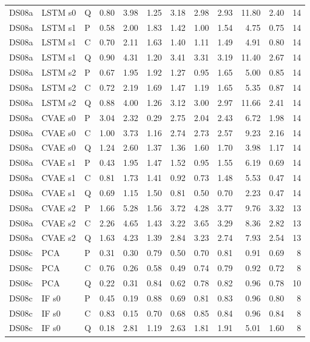 \documentclass[10pt]{article}
\begin{document}
{\begin{longtable}{lllrrrrrrrrr}
DS08a & LSTM s0 & Q & 0.80 & 3.98 & 1.25 & 3.18 & 2.98 & 2.93 & 11.80 & 2.40 & 14 \\
DS08a & LSTM s1 & P & 0.58 & 2.00 & 1.83 & 1.42 & 1.00 & 1.54 & 4.75 & 0.75 & 14 \\
DS08a & LSTM s1 & C & 0.70 & 2.11 & 1.63 & 1.40 & 1.11 & 1.49 & 4.91 & 0.80 & 14 \\
DS08a & LSTM s1 & Q & 0.90 & 4.31 & 1.20 & 3.41 & 3.31 & 3.19 & 11.40 & 2.67 & 14 \\
DS08a & LSTM s2 & P & 0.67 & 1.95 & 1.92 & 1.27 & 0.95 & 1.65 & 5.00 & 0.85 & 14 \\
DS08a & LSTM s2 & C & 0.72 & 2.19 & 1.69 & 1.47 & 1.19 & 1.65 & 5.35 & 0.87 & 14 \\
DS08a & LSTM s2 & Q & 0.88 & 4.00 & 1.26 & 3.12 & 3.00 & 2.97 & 11.66 & 2.41 & 14 \\
DS08a & CVAE s0 & P & 3.04 & 2.32 & 0.29 & 2.75 & 2.04 & 2.43 & 6.72 & 1.98 & 14 \\
DS08a & CVAE s0 & C & 1.00 & 3.73 & 1.16 & 2.74 & 2.73 & 2.57 & 9.23 & 2.16 & 14 \\
DS08a & CVAE s0 & Q & 1.24 & 2.60 & 1.37 & 1.36 & 1.60 & 1.70 & 3.98 & 1.17 & 14 \\
DS08a & CVAE s1 & P & 0.43 & 1.95 & 1.47 & 1.52 & 0.95 & 1.55 & 6.19 & 0.69 & 14 \\
DS08a & CVAE s1 & C & 0.81 & 1.73 & 1.41 & 0.92 & 0.73 & 1.48 & 5.53 & 0.47 & 14 \\
DS08a & CVAE s1 & Q & 0.69 & 1.15 & 1.50 & 0.81 & 0.50 & 0.70 & 2.23 & 0.47 & 14 \\
DS08a & CVAE s2 & P & 1.66 & 5.28 & 1.56 & 3.72 & 4.28 & 3.77 & 9.76 & 3.32 & 13 \\
DS08a & CVAE s2 & C & 2.26 & 4.65 & 1.43 & 3.22 & 3.65 & 3.29 & 8.36 & 2.82 & 13 \\
DS08a & CVAE s2 & Q & 1.63 & 4.23 & 1.39 & 2.84 & 3.23 & 2.74 & 7.93 & 2.54 & 13 \\
\midrule
DS08c & PCA & P & 0.31 & 0.30 & 0.79 & 0.50 & 0.70 & 0.81 & 0.91 & 0.69 & 8 \\
DS08c & PCA & C & 0.76 & 0.26 & 0.58 & 0.49 & 0.74 & 0.79 & 0.92 & 0.72 & 8 \\
DS08c & PCA & Q & 0.22 & 0.31 & 0.84 & 0.62 & 0.78 & 0.82 & 0.96 & 0.78 & 10 \\
DS08c & IF s0 & P & 0.45 & 0.19 & 0.88 & 0.69 & 0.81 & 0.83 & 0.96 & 0.80 & 8 \\
DS08c & IF s0 & C & 0.83 & 0.15 & 0.70 & 0.68 & 0.85 & 0.84 & 0.96 & 0.84 & 8 \\
DS08c & IF s0 & Q & 0.18 & 2.81 & 1.19 & 2.63 & 1.81 & 1.91 & 5.01 & 1.60 & 8 \\

\end{longtable}}
\end{document}
